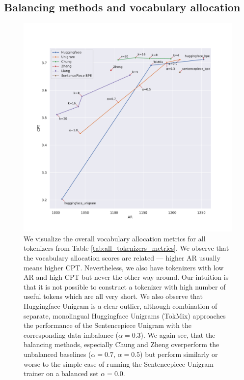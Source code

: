 \subsection{Balancing methods and vocabulary allocation}



\begin{figure}[H]
    \centering
    \includegraphics[width=\textwidth]{figures/all_tokenizers_AR_vs_CPT.pdf}
    \caption{We visualize the overall vocabulary allocation metrics for all tokenizers from Table \ref{tab:all_tokenizers_metrics}. We observe that the vocabulary allocation scores are related --- higher AR usually means higher CPT. Nevertheless, we also have tokenizers with low AR and high CPT but never the other way around. Our intuition is that it is not possible to construct a tokenizer with high number of useful tokens which are all very short. We also observe that Huggingface Unigram is a clear outlier, although combination of separate, monolingual Huggingface Unigrams (TokMix) approaches the performance of the Sentencepiece Unigram with the corresponding data imbalance ($\alpha=0.3$). We again see, that the balancing methods, especially Chung and Zheng overperform the unbalanced baselines ($\alpha=0.7$, $\alpha=0.5$) but perform similarly or worse to the simple case of running the Sentencepiece Unigram trainer on a balanced set $\alpha=0.0$.}
    \label{fig:all_tokenizers_AR_vs_CPT}
\end{figure}

